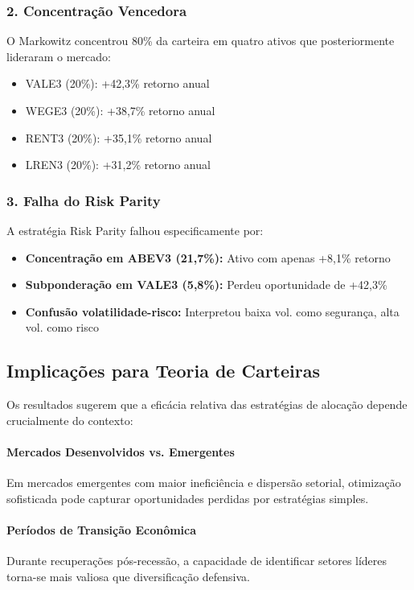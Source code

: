 \subsubsection{2. Concentração Vencedora}
O Markowitz concentrou 80\% da carteira em quatro ativos que posteriormente lideraram o mercado:
\begin{itemize}
    \item VALE3 (20\%): +42,3\% retorno anual
    \item WEGE3 (20\%): +38,7\% retorno anual  
    \item RENT3 (20\%): +35,1\% retorno anual
    \item LREN3 (20\%): +31,2\% retorno anual
\end{itemize}

\subsubsection{3. Falha do Risk Parity}
A estratégia Risk Parity falhou especificamente por:
\begin{itemize}
    \item \textbf{Concentração em ABEV3 (21,7\%):} Ativo com apenas +8,1\% retorno
    \item \textbf{Subponderação em VALE3 (5,8\%):} Perdeu oportunidade de +42,3\%
    \item \textbf{Confusão volatilidade-risco:} Interpretou baixa vol. como segurança, alta vol. como risco
\end{itemize}

\subsection{Implicações para Teoria de Carteiras}

Os resultados sugerem que a eficácia relativa das estratégias de alocação depende crucialmente do contexto:

\paragraph{Mercados Desenvolvidos vs. Emergentes}
Em mercados emergentes com maior ineficiência e dispersão setorial, otimização sofisticada pode capturar oportunidades perdidas por estratégias simples.

\paragraph{Períodos de Transição Econômica}
Durante recuperações pós-recessão, a capacidade de identificar setores líderes torna-se mais valiosa que diversificação defensiva.

